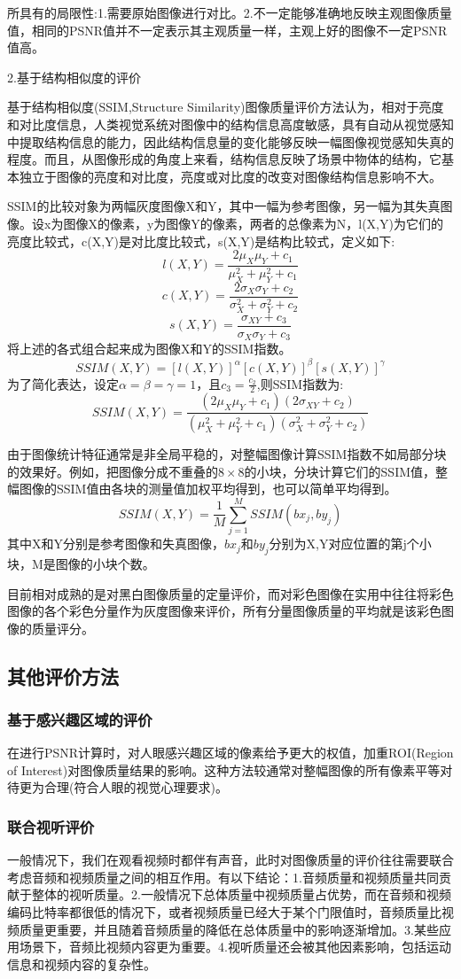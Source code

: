\documentclass[11pt]{article}
\begin{document}
所具有的局限性:1.需要原始图像进行对比。2.不一定能够准确地反映主观图像质量值，相同的PSNR值并不一定表示其主观质量一样，主观上好的图像不一定PSNR值高。

2.基于结构相似度的评价

基于结构相似度(SSIM,Structure Similarity)图像质量评价方法认为，相对于亮度和对比度信息，人类视觉系统对图像中的结构信息高度敏感，具有自动从视觉感知中提取结构信息的能力，因此结构信息量的变化能够反映一幅图像视觉感知失真的程度。而且，从图像形成的角度上来看，结构信息反映了场景中物体的结构，它基本独立于图像的亮度和对比度，亮度或对比度的改变对图像结构信息影响不大。

SSIM的比较对象为两幅灰度图像X和Y，其中一幅为参考图像，另一幅为其失真图像。设x为图像X的像素，y为图像Y的像素，两者的总像素为N，l(X,Y)为它们的亮度比较式，c(X,Y)是对比度比较式，s(X,Y)是结构比较式，定义如下:
$$l(X,Y)=\frac{2\mu_X\mu_Y+c_1}{\mu_X^2+\mu_Y^2+c_1}$$
$$c(X,Y)=\frac{2\sigma_X\sigma_Y+c_2}{\sigma_X^2+\sigma_Y^2+c_2}$$
$$s(X,Y)=\frac{\sigma_{XY}+c_3}{\sigma_X\sigma_Y+c_3}$$
将上述的各式组合起来成为图像X和Y的SSIM指数。
$$SSIM(X,Y)=[l(X,Y)]^{\alpha}[c(X,Y)]^{\beta}[s(X,Y)]^{\gamma}$$
为了简化表达，设定$\alpha =\beta = \gamma = 1$，且$c_3=\frac{c_2}{2}$,则SSIM指数为:
$$SSIM(X,Y)=\frac{(2\mu_X\mu_Y+c_1)(2\sigma_{XY}+c_2)}{(\mu_X^2+\mu_Y^2+c_1)(\sigma_X^2+\sigma_Y^2+c_2)}$$

由于图像统计特征通常是非全局平稳的，对整幅图像计算SSIM指数不如局部分块的效果好。例如，把图像分成不重叠的$8\times8$的小块，分块计算它们的SSIM值，整幅图像的SSIM值由各块的测量值加权平均得到，也可以简单平均得到。
$$SSIM(X,Y)=\frac{1}{M}\sum_{j=1}^{M}SSIM(bx_j,by_j)$$
其中X和Y分别是参考图像和失真图像，$bx_j$和$by_j$分别为X,Y对应位置的第j个小块，M是图像的小块个数。

目前相对成熟的是对黑白图像质量的定量评价，而对彩色图像在实用中往往将彩色图像的各个彩色分量作为灰度图像来评价，所有分量图像质量的平均就是该彩色图像的质量评分。

\subsection{其他评价方法}
\subsubsection{基于感兴趣区域的评价}
在进行PSNR计算时，对人眼感兴趣区域的像素给予更大的权值，加重ROI(Region of Interest)对图像质量结果的影响。这种方法较通常对整幅图像的所有像素平等对待更为合理(符合人眼的视觉心理要求)。
\subsubsection{联合视听评价}
一般情况下，我们在观看视频时都伴有声音，此时对图像质量的评价往往需要联合考虑音频和视频质量之间的相互作用。有以下结论：1.音频质量和视频质量共同贡献于整体的视听质量。2.一般情况下总体质量中视频质量占优势，而在音频和视频编码比特率都很低的情况下，或者视频质量已经大于某个门限值时，音频质量比视频质量更重要，并且随着音频质量的降低在总体质量中的影响逐渐增加。3.某些应用场景下，音频比视频内容更为重要。4.视听质量还会被其他因素影响，包括运动信息和视频内容的复杂性。
\end{document}
